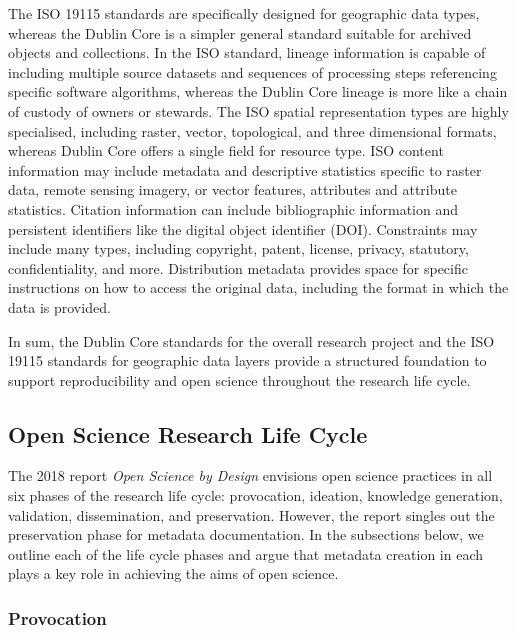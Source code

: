 \documentclass{isprs} %
\begin{document}
The ISO 19115 standards are specifically designed for geographic data types, whereas the Dublin Core is a simpler general standard suitable for archived objects and collections.
In the ISO standard, lineage information is capable of including multiple source datasets and sequences of processing steps referencing specific software algorithms, whereas the Dublin Core lineage is more like a chain of custody of owners or stewards.
The ISO spatial representation types are highly specialised, including raster, vector, topological, and three dimensional formats, whereas Dublin Core offers a single field for resource type. 
ISO content information may include metadata and descriptive statistics specific to raster data, remote sensing imagery, or vector features, attributes and attribute statistics. 
Citation information can include bibliographic information and persistent identifiers like the digital object identifier (DOI). 
Constraints may include many types, including copyright, patent, license, privacy, statutory, confidentiality, and more. 
Distribution metadata provides space for specific instructions on how to access the original data, including the format in which the data is provided.

In sum, the Dublin Core standards for the overall research project and the ISO 19115 standards for geographic data layers provide a structured foundation to support reproducibility and open science throughout the research life cycle.

\subsection{Open Science Research Life Cycle}\label{sec:lifecycle}

The 2018 \citeauthor{NASEM2018} report \textit{Open Science by Design} envisions open science practices in all six phases of the research life cycle: provocation, ideation, knowledge generation, validation, dissemination, and preservation. 
However, the report singles out the preservation phase for metadata documentation.
In the subsections below, we outline each of the life cycle phases and argue that metadata creation in each plays a key role in achieving the aims of open science.

\subsubsection{Provocation}
\end{document}
